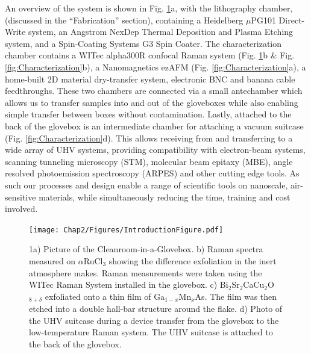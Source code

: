 An overview of the system is shown in Fig. \ref{fig:Overview}a, with the lithography chamber, (discussed in the ``Fabrication'' section), containing a Heidelberg $\mu$PG101 Direct-Write system, an Angstrom NexDep Thermal Deposition and Plasma Etching system, and a Spin-Coating Systems G3 Spin Coater. The characterization chamber contains a WITec alpha300R confocal Raman system (Fig. \ref{fig:Overview}b \& Fig. \ref{fig:Characterization}b), a Nanomagnetics ezAFM (Fig. \ref{fig:Characterization}a), a home-built 2D material dry-transfer system, electronic BNC and banana cable feedthroughs. These two chambers are connected via a small antechamber which allows us to transfer samples into and out of the gloveboxes while also enabling simple transfer between boxes without contamination. Lastly, attached to the back of the glovebox is an intermediate chamber for attaching a vacuum suitcase (Fig. \ref{fig:Characterization}d). This allows receiving from and transferring to a wide array of UHV systems, providing compatibility with electron-beam systems, 
scanning tunneling microscopy (STM), molecular beam epitaxy (MBE), angle resolved photoemission spectroscopy (ARPES) and other cutting edge tools. As such our processes and design enable a range of scientific tools on nanoscale, air-sensitive materials, while simultaneously reducing the time, training and cost involved.    

\begin{figure}
    \centering
    \texttt{[image: Chap2/Figures/IntroductionFigure.pdf]}
    \caption{1a) Picture of the Cleanroom-in-a-Glovebox. b) Raman spectra measured on $\alpha$RuCl$_{3}$ showing the difference exfoliation in the inert atmosphere makes. Raman measurements were taken using the WITec Raman System installed in the glovebox. c) Bi$_{2}$Sr$_{2}$CaCu$_{2}$O$_{8+\delta}$ exfoliated onto a thin film of Ga$_{1-x}$Mn$_{x}$As. The film was then etched into a double hall-bar structure around the flake. d) Photo of the UHV suitcase during a device transfer from the glovebox to the low-temperature Raman system. The UHV suitcase is attached to the back of the glovebox.}
    \label{fig:Overview}
\end{figure}


